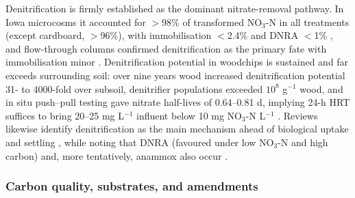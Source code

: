 Denitrification is firmly established as the dominant nitrate-removal pathway. In Iowa microcosms it accounted for $>$98\% of transformed NO$_3$-N in all treatments (except cardboard, $>$96\%), with immobilisation $<$2.4\% and DNRA $<$1\% \parencite{Greenan2006}, and flow-through columns confirmed denitrification as the primary fate with immobilisation minor \parencite{Greenan2009}. Denitrification potential in woodchips is sustained and far exceeds surrounding soil: over nine years wood increased denitrification potential 31- to 4000-fold over subsoil, denitrifier populations exceeded $10^8$ g$^{-1}$ wood, and in situ push--pull testing gave nitrate half-lives of 0.64--0.81 d, implying 24-h HRT suffices to bring 20--25 mg L$^{-1}$ influent below 10 mg NO$_3$-N L$^{-1}$ \parencite{Moorman2010}. Reviews likewise identify denitrification as the main mechanism ahead of biological uptake and settling \parencite{Mendes2021}, while noting that DNRA (favoured under low NO$_3$-N and high carbon) and, more tentatively, anammox also occur \parencite{Hartfiel2022}.

\subsubsection{Carbon quality, substrates, and amendments}

